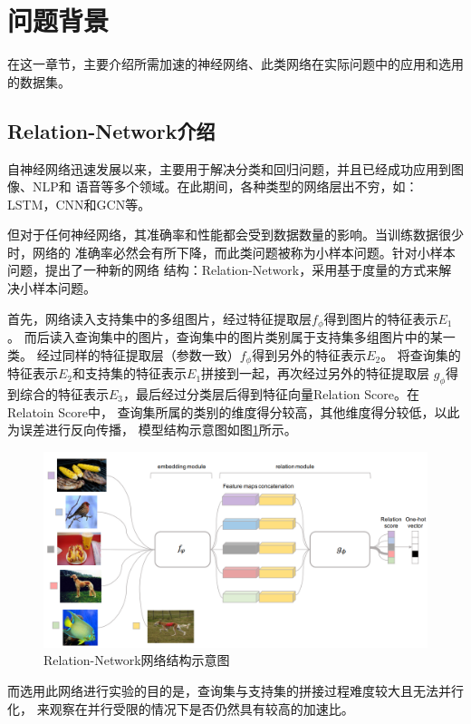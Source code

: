 \section{问题背景}

在这一章节，主要介绍所需加速的神经网络、此类网络在实际问题中的应用和选用的数据集。

\subsection{Relation-Network介绍}

自神经网络迅速发展以来，主要用于解决分类和回归问题，并且已经成功应用到图像、NLP和
语音等多个领域。在此期间，各种类型的网络层出不穷，如：LSTM，CNN和GCN等。

但对于任何神经网络，其准确率和性能都会受到数据数量的影响。当训练数据很少时，网络的
准确率必然会有所下降，而此类问题被称为小样本问题。针对小样本问题，提出了一种新的网络
结构：Relation-Network，采用基于度量的方式来解决小样本问题\cite{RN}。

首先，网络读入支持集中的多组图片，经过特征提取层$f_\phi$得到图片的特征表示$E_1$。
而后读入查询集中的图片，查询集中的图片类别属于支持集多组图片中的某一类。
经过同样的特征提取层（参数一致）$f_\phi$得到另外的特征表示$E_2$。
将查询集的特征表示$E_2$和支持集的特征表示$E_1$拼接到一起，再次经过另外的特征提取层
$g_\phi$得到综合的特征表示$E_3$，最后经过分类层后得到特征向量Relation Score。在Relatoin Score中，
查询集所属的类别的维度得分较高，其他维度得分较低，以此为误差进行反向传播，
模型结构示意图如图\ref{fig:com}所示。

\begin{figure}[ht]
    \centering
    \includegraphics[scale=0.25]{figure/compare.png}
    \caption{Relation-Network网络结构示意图}
    \label{fig:com}
\end{figure}

而选用此网络进行实验的目的是，查询集与支持集的拼接过程难度较大且无法并行化，
来观察在并行受限的情况下是否仍然具有较高的加速比。

